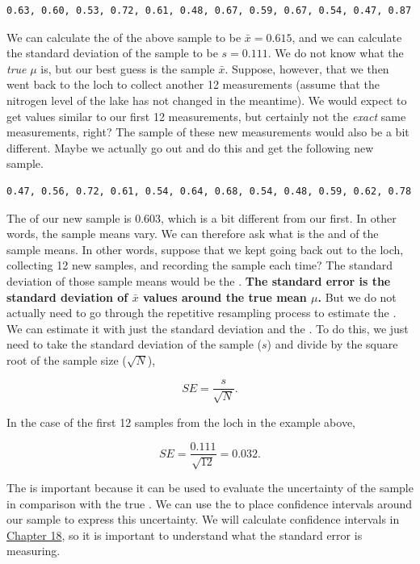 \documentclass[
  openany]{krantz}
\begin{document}
\begin{verbatim}
0.63, 0.60, 0.53, 0.72, 0.61, 0.48, 0.67, 0.59, 0.67, 0.54, 0.47, 0.87
\end{verbatim}

We can calculate the  of the above sample to be \(\bar{x} = 0.615\), and we can calculate the standard deviation of the sample to be \(s = 0.111\).
We do not know what the \emph{true}  \(\mu\) is, but our best guess is the sample  \(\bar{x}\).
Suppose, however, that we then went back to the loch to collect another 12 measurements (assume that the nitrogen level of the lake has not changed in the meantime).
We would expect to get values similar to our first 12 measurements, but certainly not the \emph{exact} same measurements, right?
The sample  of these new measurements would also be a bit different.
Maybe we actually go out and do this and get the following new sample.

\begin{verbatim}
0.47, 0.56, 0.72, 0.61, 0.54, 0.64, 0.68, 0.54, 0.48, 0.59, 0.62, 0.78
\end{verbatim}

\newpage

The  of our new sample is 0.603, which is a bit different from our first.
In other words, the sample means vary.
We can therefore ask what is the  and  of the sample means.
In other words, suppose that we kept going back out to the loch, collecting 12 new samples, and recording the sample  each time?
The standard deviation of those sample means would be the .
\textbf{The standard error is the standard deviation of \(\bar{x}\) values around the true mean \(\mu\).}
But we do not actually need to go through the repetitive resampling process to estimate the .
We can estimate it with just the standard deviation and the .
To do this, we just need to take the standard deviation of the sample (\(s\)) and divide by the square root of the sample size (\(\sqrt{N}\)),

\[SE = \frac{s}{\sqrt{N}}.\]

In the case of the first 12 samples from the loch in the example above,

\[SE = \frac{0.111}{\sqrt{12}} = 0.032.\]

The  is important because it can be used to evaluate the uncertainty of the sample  in comparison with the true .
We can use the  to place confidence intervals around our sample  to express this uncertainty.
We will calculate confidence intervals in \protect\hyperlink{Chapter_18}{Chapter 18}, so it is important to understand what the standard error is measuring.
\end{document}
